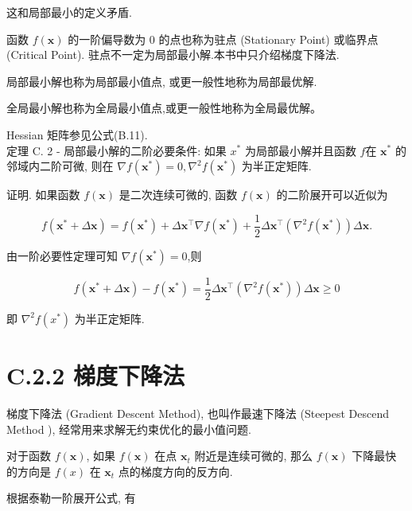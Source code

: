 \documentclass[10pt]{article}
\begin{document}
这和局部最小的定义矛盾.

函数 $f(\boldsymbol{x})$ 的一阶偏导数为 0 的点也称为驻点 (Stationary Point) 或临界点 (Critical Point). 驻点不一定为局部最小解.本书中只介绍梯度下降法.

局部最小解也称为局部最小值点, 或更一般性地称为局部最优解.

全局最小解也称为全局最小值点,或更一般性地称为全局最优解。

Hessian 矩阵参见公式(B.11).\\
定理 C. 2 - 局部最小解的二阶必要条件: 如果 $x^{*}$ 为局部最小解并且函数 $f$在 $\boldsymbol{x}^{*}$ 的邻域内二阶可微, 则在 $\nabla f\left(\boldsymbol{x}^{*}\right)=0, \nabla^{2} f\left(\boldsymbol{x}^{*}\right)$ 为半正定矩阵.

证明. 如果函数 $f(\boldsymbol{x})$ 是二次连续可微的, 函数 $f(\boldsymbol{x})$ 的二阶展开可以近似为


\begin{equation*}
f\left(\boldsymbol{x}^{*}+\Delta \boldsymbol{x}\right)=f\left(\boldsymbol{x}^{*}\right)+\Delta \boldsymbol{x}^{\top} \nabla f\left(\boldsymbol{x}^{*}\right)+\frac{1}{2} \Delta \boldsymbol{x}^{\top}\left(\nabla^{2} f\left(\boldsymbol{x}^{*}\right)\right) \Delta \boldsymbol{x} . \tag{C.5}
\end{equation*}


由一阶必要性定理可知 $\nabla f\left(\boldsymbol{x}^{*}\right)=0$,则


\begin{equation*}
f\left(\boldsymbol{x}^{*}+\Delta \boldsymbol{x}\right)-f\left(\boldsymbol{x}^{*}\right)=\frac{1}{2} \Delta \boldsymbol{x}^{\top}\left(\nabla^{2} f\left(\boldsymbol{x}^{*}\right)\right) \Delta \boldsymbol{x} \geq 0 \tag{C.6}
\end{equation*}


即 $\nabla^{2} f\left(x^{*}\right)$ 为半正定矩阵.

\section*{C.2.2 梯度下降法}
梯度下降法 (Gradient Descent Method), 也叫作最速下降法 (Steepest Descend Method ), 经常用来求解无约束优化的最小值问题.

对于函数 $f(\boldsymbol{x})$, 如果 $f(\boldsymbol{x})$ 在点 $\boldsymbol{x}_{t}$ 附近是连续可微的, 那么 $f(\boldsymbol{x})$ 下降最快的方向是 $f(x)$ 在 $\boldsymbol{x}_{t}$ 点的梯度方向的反方向.

根据泰勒一阶展开公式, 有
\end{document}
